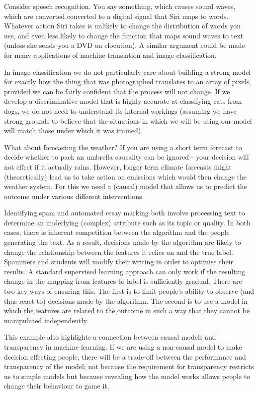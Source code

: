 \documentclass[11pt,a4paper,oneside]{book}
\theoremstyle{plain}
\theoremstyle{definition}
\begin{document}
Consider speech recognition. You say something, which causes sound waves, which are converted converted to a digital signal that Siri maps to words. Whatever action Siri takes is unlikely to change the distribution of words you use, and even less likely to change the function that maps sound waves to text (unless she sends you a DVD on elocution). A similar argument could be made for many applications of machine translation and image classification. 

In image classification we do not particularly care about building a strong model for exactly how the thing that was photographed translates to an array of pixels, provided we can be fairly confident that the process will not change. If we develop a discriminative model that is highly accurate at classifying cats from dogs, we do not need to understand its internal workings (assuming we have strong grounds to believe that the situations in which we will be using our model will match those under which it was trained).

What about forecasting the weather? If you are using a short term forecast to decide whether to pack an umbrella  causality can be ignored - your decision will not effect if it actually rains. However, longer term climate forecasts might (theoretically) lead us to take action on emissions which would then change the weather system. For this we need a (causal) model that allows us to predict the outcome under various different interventions.

Identifying spam and automated essay marking both involve  processing text to determine an underlying (complex) attribute such as its topic or quality. In both cases, there is inherent competition between the algorithm and the people generating the text. As a result, decisions made by the algorithm are likely to change the relationship between the features it relies on and the true label. Spammers and students will modify their writing in order to optimise their results. A standard supervised learning approach can only work if the resulting change in the mapping from features to label is sufficiently gradual. There are two key ways of ensuring this. The first is to limit people's ability to observe (and thus react to) decisions made by the algorithm. The second is to use a model in which the features are related to the outcome in such a way that they cannot be manipulated independently. 

This example also highlights a connection between causal models and transparency in machine learning. If we are using a non-causal model to make decision effecting people, there will be a trade-off between the performance and transparency of the model; not because the requirement for transparency restricts us to simple models but because revealing how the model works allows people to change their behaviour to game it. 
\end{document}
